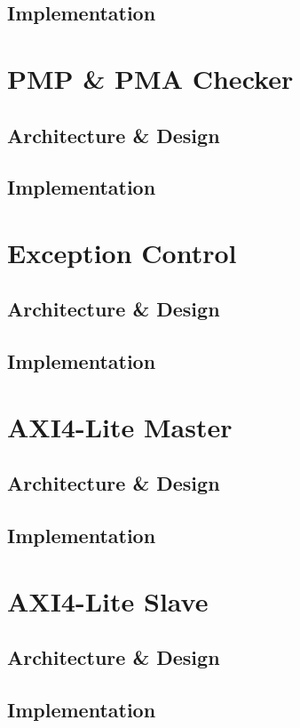 \subsection{Implementation}

\section{PMP \& PMA Checker}
\subsection{Architecture \& Design}
\subsection{Implementation}

\section{Exception Control}
\subsection{Architecture \& Design}
\subsection{Implementation}

\section{AXI4-Lite Master}
\subsection{Architecture \& Design}
\subsection{Implementation}

\section{AXI4-Lite Slave}
\subsection{Architecture \& Design}
\subsection{Implementation}

